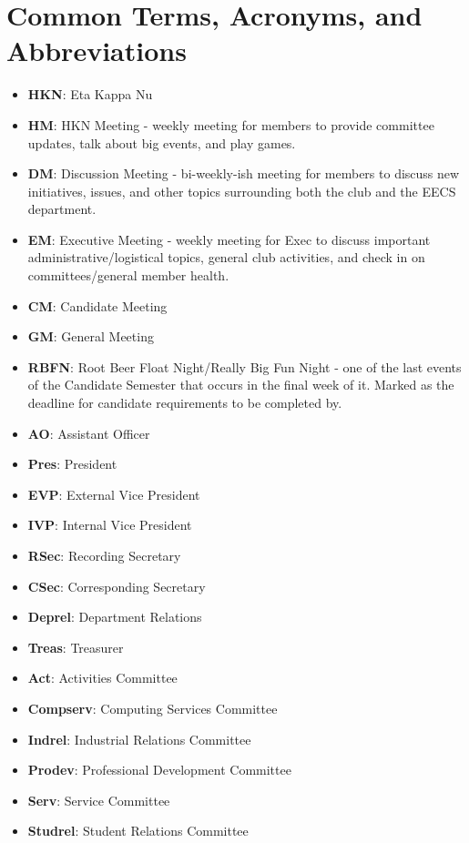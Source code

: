\documentclass[11pt, article, oneside]{memoir}
\begin{document}
    \chapter{Common Terms, Acronyms, and Abbreviations}
    \begin{itemize}
        \item \textbf{HKN}: Eta Kappa Nu
        \item \textbf{HM}: HKN Meeting - weekly meeting for members to provide committee updates, talk about big events, and play games.
        \item \textbf{DM}: Discussion Meeting - bi-weekly-ish meeting for members to discuss new initiatives, issues, and other topics surrounding both the club and the EECS department.
        \item \textbf{EM}: Executive Meeting - weekly meeting for Exec to discuss important administrative/logistical topics, general club activities, and check in on committees/general member health.
        \item \textbf{CM}: Candidate Meeting
        \item \textbf{GM}: General Meeting
        \item \textbf{RBFN}: Root Beer Float Night/Really Big Fun Night - one of the last events of the Candidate Semester that occurs in the final week of it.
            Marked as the deadline for candidate requirements to be completed by.
        \item \textbf{AO}: Assistant Officer
        \item \textbf{Pres}: President
        \item \textbf{EVP}: External Vice President
        \item \textbf{IVP}: Internal Vice President
        \item \textbf{RSec}: Recording Secretary
        \item \textbf{CSec}: Corresponding Secretary
        \item \textbf{Deprel}: Department Relations
        \item \textbf{Treas}: Treasurer
        \item \textbf{Act}: Activities Committee
        \item \textbf{Compserv}: Computing Services Committee
        \item \textbf{Indrel}: Industrial Relations Committee
        \item \textbf{Prodev}: Professional Development Committee
        \item \textbf{Serv}: Service Committee
        \item \textbf{Studrel}: Student Relations Committee
    \end{itemize}
    
\end{document}

